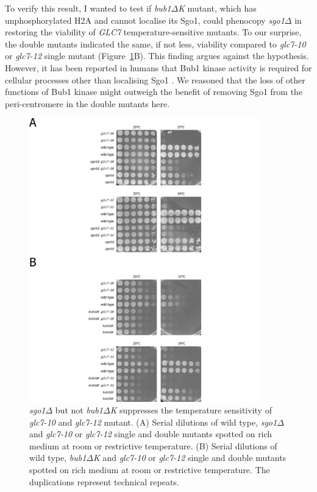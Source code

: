 To verify this result, I wanted to test if \textit{bub1$\Delta$K} mutant, which has unphosphorylated H2A and cannot localise its Sgo1, could phenocopy \textit{sgo1$\Delta$} in restoring the viability of \textit{GLC7} temperature-sensitive mutants. To our surprise, the double mutants indicated the same, if not less, viability compared to \textit{glc7-10} or \textit{glc7-12} single mutant (Figure~\ref{fig:growthassay}B). This finding argues against the hypothesis. However, it has been reported in humans that Bub1 kinase activity is required for cellular processes other than localising Sgo1 \citep{Tang2004, Nyati2015TheSignaling, Li2018TheReplication, Zhang2020FunctioningMitosis}. We reasoned that the loss of other functions of Bub1 kinase might outweigh the benefit of removing Sgo1 from the peri-centromere in the double mutants here. 

\begin{figure}[htbp]
  \centering
  \includegraphics[width=0.9\textwidth]{chapter3/figures/glc7 mutants growth assaay.pdf}
  \caption[\textit{sgo1$\Delta$} but not \textit{bub1$\Delta$K} suppresses the temperature sensitivity of \textit{glc7-10} and \textit{glc7-12} mutant]{\textit{sgo1$\Delta$} but not \textit{bub1$\Delta$K} suppresses the temperature sensitivity of \textit{glc7-10} and \textit{glc7-12} mutant. (A) Serial dilutions of wild type, \textit{sgo1$\Delta$} and \textit{glc7-10} or \textit{glc7-12} single and double mutants spotted on rich medium at room or restrictive temperature. (B) Serial dilutions of wild type, \textit{bub1$\Delta$K} and \textit{glc7-10} or \textit{glc7-12} single and double mutants spotted on rich medium at room or restrictive temperature. The duplications represent technical repeats. }
  \label{fig:growthassay}
\end{figure}

